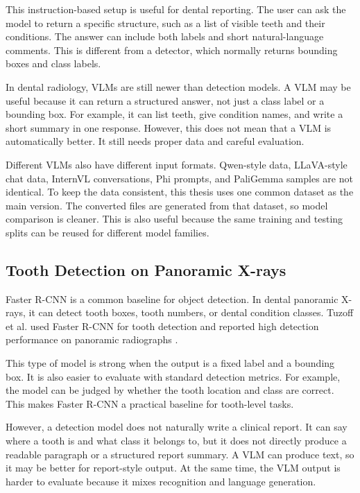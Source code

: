 \documentclass[a4paper,12pt]{report}
\begin{document}
This instruction-based setup is useful for dental reporting. The user can ask the model to return a specific structure, such as a list of visible teeth and their conditions. The answer can include both labels and short natural-language comments. This is different from a detector, which normally returns bounding boxes and class labels.

In dental radiology, VLMs are still newer than detection models. A VLM may be useful because it can return a structured answer, not just a class label or a bounding box. For example, it can list teeth, give condition names, and write a short summary in one response. However, this does not mean that a VLM is automatically better. It still needs proper data and careful evaluation.

Different VLMs also have different input formats. Qwen-style data, LLaVA-style chat data, InternVL conversations, Phi prompts, and PaliGemma samples are not identical. To keep the data consistent, this thesis uses one common dataset as the main version. The converted files are generated from that dataset, so model comparison is cleaner. This is also useful because the same training and testing splits can be reused for different model families.


\subsection*{Tooth Detection on Panoramic X-rays}
Faster R-CNN is a common baseline for object detection. In dental panoramic X-rays, it can detect tooth boxes, tooth numbers, or dental condition classes. Tuzoff et al. used Faster R-CNN for tooth detection and reported high detection performance on panoramic radiographs \cite{tuzoff2019tooth}.

This type of model is strong when the output is a fixed label and a bounding box. It is also easier to evaluate with standard detection metrics. For example, the model can be judged by whether the tooth location and class are correct. This makes Faster R-CNN a practical baseline for tooth-level tasks.

However, a detection model does not naturally write a clinical report. It can say where a tooth is and what class it belongs to, but it does not directly produce a readable paragraph or a structured report summary. A VLM can produce text, so it may be better for report-style output. At the same time, the VLM output is harder to evaluate because it mixes recognition and language generation.
\end{document}
